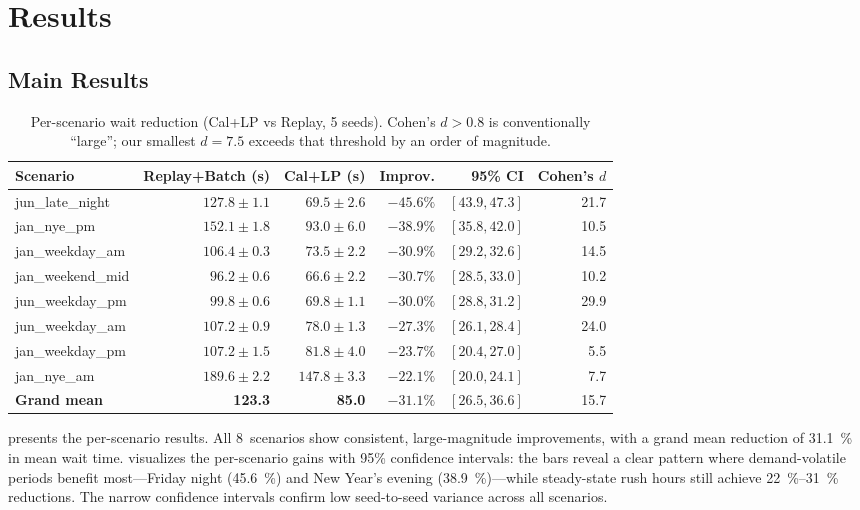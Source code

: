 \documentclass[conference,10pt]{IEEEtran}
\begin{document}
\section{Results}
\label{sec:results}

\subsection{Main Results}

\begin{table}[t]
  \centering
  \caption{Per-scenario wait reduction (Cal+LP vs Replay, 5 seeds).  Cohen's $d > 0.8$ is conventionally ``large''; our smallest $d = 7.5$ exceeds that threshold by an order of magnitude.}
  \label{tab:main_results}
  \begin{tabular}{@{}lrrrrr@{}}
    \toprule
    Scenario & Replay+Batch (s) & Cal+LP (s) & Improv. & 95\% CI & Cohen's $d$ \\
    \midrule
    jun\_late\_night    & $127.8 \pm 1.1$ & $69.5 \pm 2.6$ & $-45.6\%$ & $[43.9, 47.3]$ & 21.7 \\
    jan\_nye\_pm        & $152.1 \pm 1.8$ & $93.0 \pm 6.0$ & $-38.9\%$ & $[35.8, 42.0]$ & 10.5 \\
    jan\_weekday\_am    & $106.4 \pm 0.3$ & $73.5 \pm 2.2$ & $-30.9\%$ & $[29.2, 32.6]$ & 14.5 \\
    jan\_weekend\_mid   & $96.2 \pm 0.6$  & $66.6 \pm 2.2$ & $-30.7\%$ & $[28.5, 33.0]$ & 10.2 \\
    jun\_weekday\_pm    & $99.8 \pm 0.6$  & $69.8 \pm 1.1$ & $-30.0\%$ & $[28.8, 31.2]$ & 29.9 \\
    jun\_weekday\_am    & $107.2 \pm 0.9$ & $78.0 \pm 1.3$ & $-27.3\%$ & $[26.1, 28.4]$ & 24.0 \\
    jan\_weekday\_pm    & $107.2 \pm 1.5$ & $81.8 \pm 4.0$ & $-23.7\%$ & $[20.4, 27.0]$ & 5.5 \\
    jan\_nye\_am        & $189.6 \pm 2.2$ & $147.8 \pm 3.3$ & $-22.1\%$ & $[20.0, 24.1]$ & 7.7 \\
    \midrule
    \textbf{Grand mean} & \textbf{123.3} & \textbf{85.0} & \textbf{$-31.1\%$} & $[26.5, 36.6]$ & 15.7 \\
    \bottomrule
  \end{tabular}
\end{table}

 presents the per-scenario results. All 8~scenarios
show consistent, large-magnitude improvements, with a grand mean
reduction of \SI{31.1}{\percent} in mean wait time.
 visualizes the per-scenario gains with
95\% confidence intervals: the bars reveal a clear pattern where
demand-volatile periods benefit most---Friday night
(\SI{45.6}{\percent}) and New Year's evening (\SI{38.9}{\percent})---while
steady-state rush hours still achieve \SIrange{22}{31}{\percent}
reductions. The narrow confidence intervals confirm low seed-to-seed
variance across all scenarios.
\end{document}
